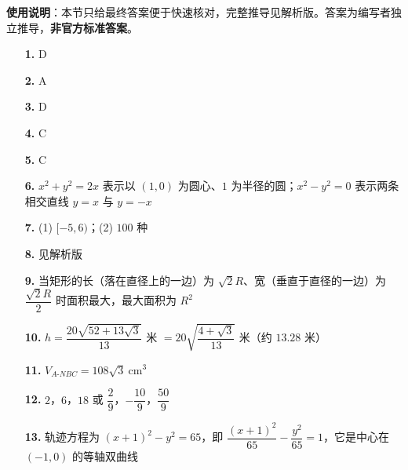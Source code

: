 
\begin{gknotice}
\textbf{使用说明}：本节只给最终答案便于快速核对，完整推导见解析版。答案为编写者独立推导，\textbf{非官方标准答案}。
\end{gknotice}

\begin{itemize}[leftmargin=2.6em]
  \item[\textbf{1.}] D
  \item[\textbf{2.}] A
  \item[\textbf{3.}] D
  \item[\textbf{4.}] C
  \item[\textbf{5.}] C
  \item[\textbf{6.}] $x^2+y^2=2x$ 表示以 $(1,0)$ 为圆心、$1$ 为半径的圆；$x^2-y^2=0$ 表示两条相交直线 $y=x$ 与 $y=-x$
  \item[\textbf{7.}] (1) $[-5,6)$；(2) $100$ 种
  \item[\textbf{8.}] 见解析版
  \item[\textbf{9.}] 当矩形的长（落在直径上的一边）为 $\sqrt2R$、宽（垂直于直径的一边）为 $\dfrac{\sqrt2R}{2}$ 时面积最大，最大面积为 $R^2$
  \item[\textbf{10.}] $h=\dfrac{20\sqrt{52+13\sqrt3}}{13}$ 米 $=20\sqrt{\dfrac{4+\sqrt3}{13}}$ 米（约 $13.28$ 米）
  \item[\textbf{11.}] $V_{A\text{-}NBC}=108\sqrt3\ \mathrm{cm}^3$
  \item[\textbf{12.}] $2$，$6$，$18$ 或 $\dfrac29$，$-\dfrac{10}9$，$\dfrac{50}9$
  \item[\textbf{13.}] 轨迹方程为 $(x+1)^2-y^2=65$，即 $\dfrac{(x+1)^2}{65}-\dfrac{y^2}{65}=1$，它是中心在 $(-1,0)$ 的等轴双曲线
\end{itemize}
